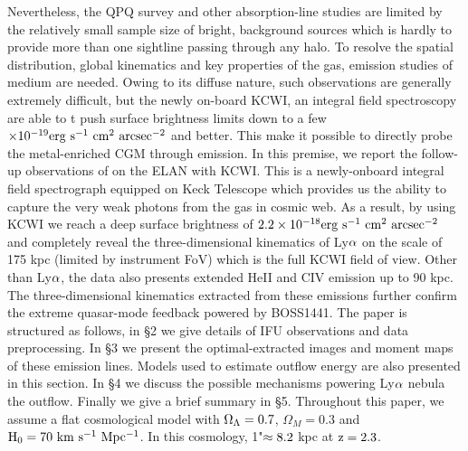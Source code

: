 \documentclass[../main.tex]{subfiles}
\begin{document}
Nevertheless, the QPQ survey and other absorption-line studies are limited by the relatively small sample size of bright, background sources which is hardly to provide more than one sightline passing through any halo. To resolve the spatial distribution, global kinematics and key properties of the gas, emission studies of medium are needed. Owing to its diffuse nature, such observations are generally extremely difficult, but the newly on-board KCWI, an integral field spectroscopy are able to t push surface brightness limits down to a few $\rm \times 10^{-19} erg \ s^{-1} \ cm^{2} \ arcsec^{-2}$ and better. This make it possible to directly probe the metal-enriched CGM through emission. In this premise, we report the follow-up observations of \citet{cai2017discovery} on the ELAN with KCWI. This is a newly-onboard integral field spectrograph equipped on Keck Telescope which provides us the ability to capture the very weak photons from the gas in cosmic web. As a result, by using KCWI we reach a deep surface brightness of $\rm 2.2 \times 10^{-18} erg \ s^{-1} \ cm^{2} \ arcsec^{-2}$ and completely reveal the three-dimensional kinematics of Ly$\rm \alpha$ on the scale of 175 kpc (limited by instrument FoV) which is the full KCWI field of view. Other than Ly$\rm \alpha$, the data also presents extended HeII and CIV emission up to 90 kpc. The three-dimensional kinematics extracted from these emissions further confirm the extreme quasar-mode feedback powered by BOSS1441. The paper is structured as follows, in \S 2 we give details of IFU observations and data preprocessing. In \S 3 we present the optimal-extracted images and moment maps of these emission lines. Models used to estimate outflow energy are also presented in this section. In \S 4 we discuss the possible mechanisms powering Ly$\rm \alpha$ nebula the outflow. Finally we give a brief summary in \S 5. Throughout this paper, we assume a flat cosmological model with $\rm \Omega_{\Lambda}=0.7$, $\Omega_{M}=0.3$ and $\rm H_{0}=70 \ km \ s^{-1} \ Mpc^{-1}$. In this cosmology, 1"$\rm \approx 8.2$ kpc at $\rm z=2.3$.
\end{document}
